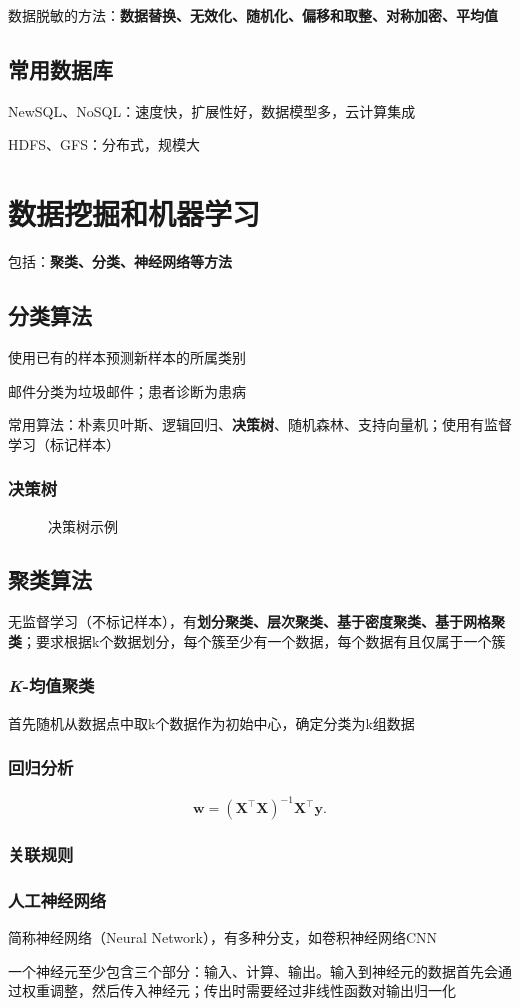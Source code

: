 \begin{notation}
    数据脱敏的方法：\textbf{数据替换、无效化、随机化、偏移和取整、对称加密、平均值}
\end{notation}
\subsection{常用数据库}%
\label{sub:常用数据库}
NewSQL、NoSQL：速度快，扩展性好，数据模型多，云计算集成

HDFS、GFS：分布式，规模大
\section{数据挖掘和机器学习}%
\label{sec:数据挖掘和机器学习}
包括：\textbf{聚类、分类、神经网络等方法}
\subsection{分类算法}%
\label{sub:分类算法}
使用已有的样本预测新样本的所属类别
\begin{eg}
    邮件分类为垃圾邮件；患者诊断为患病
\end{eg}
常用算法：朴素贝叶斯、逻辑回归、\textbf{决策树}、随机森林、支持向量机；使用有监督学习（标记样本）
\subsubsection*{决策树}%
\label{subsub*:决策树}
\begin{figure}[ht!]
    \centering
    \caption{决策树示例}
    \label{fig:决策树示例}
\end{figure}
\subsection{聚类算法}%
\label{sub:聚类算法}
无监督学习（不标记样本），有\textbf{划分聚类、层次聚类、基于密度聚类、基于网格聚类}；要求根据k个数据划分，每个簇至少有一个数据，每个数据有且仅属于一个簇
\subsubsection*{\textit{K}-均值聚类}%
\label{subsub*:K-均值聚类}
首先随机从数据点中取k个数据作为初始中心，确定分类为k组数据

\subsubsection*{回归分析}%
\label{subsub*:回归分析}
\[
    \bm{w} = \left( \bm{X}^\top \bm{X} \right)^{-1}\bm{X}^\top \bm{y}
.\]
\subsubsection*{关联规则}%
\label{subsub*:关联规则}
\subsubsection*{人工神经网络}%
\label{subsub*:人工神经网络}
简称神经网络（Neural Network），有多种分支，如卷积神经网络CNN

一个神经元至少包含三个部分：输入、计算、输出。输入到神经元的数据首先会通过权重调整，然后传入神经元；传出时需要经过非线性函数对输出归一化
